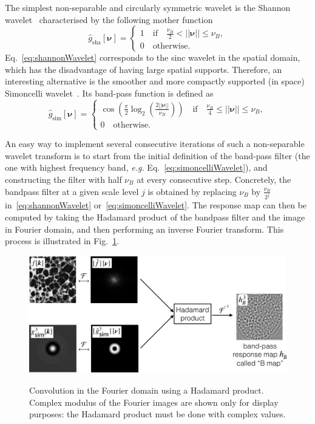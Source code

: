 \documentclass[fleqn,a4paper,oneside,openany]{book}
\begin{document}
The simplest non-separable and circularly symmetric wavelet is the Shannon wavelet~\cite{UCV2011} characterised by the following mother function
%
\begin{equation}\label{eq:shannonWavelet}
\hat{g}_{\text{sha}}[\boldsymbol{\nu}]=
\begin{cases}
1\quad\text{if}\quad\frac{\nu_B}{2}< ||\boldsymbol{\nu}|| \leq \nu_B,\\
0\quad\text{otherwise}.
\end{cases}
\end{equation}
%
Eq.~\eqref{eq:shannonWavelet} corresponds to the sinc wavelet in the spatial domain, which has the disadvantage of having large spatial supports. Therefore, an interesting alternative is the smoother and more compactly supported (in space) Simoncelli wavelet~\cite{PoS2000}. Its band-pass function is defined as
%
\begin{equation}\label{eq:simoncelliWavelet}
\hat{g}_{\text{sim}}[\boldsymbol{\nu}]=
\begin{cases}
\cos\left(\frac{\pi}{2}\log_2\left(\frac{2||\boldsymbol{\nu}||}{\nu_B}\right)\right)\quad\text{if}\quad\frac{\nu_B}{4}\leq ||\boldsymbol{\nu}|| \leq \nu_B,\\
0\quad\text{otherwise}.
\end{cases}
\end{equation}
%

An easy way to implement several consecutive iterations of such a non-separable wavelet transform is to start from the initial definition of the band-pass filter (the one with highest frequency band, \emph{e.g.} Eq.~\eqref{eq:simoncelliWavelet}), and constructing the filter with half $\nu_B$ at every consecutive step. Concretely, the bandpass filter at a given scale level $j$ is obtained by replacing $\nu_B$ by $\frac{\nu_B}{2^j}$ in~\eqref{eq:shannonWavelet} or~\eqref{eq:simoncelliWavelet}.
The response map can then be computed by taking the Hadamard product of the bandpass filter and the image in Fourier domain, and then performing an inverse Fourier transform.
This process is illustrated in Fig.~\ref{fig:hadamardConv}.
%
\begin{figure}
\centering
\includegraphics[trim = 0 0 0 0, clip, width=1\linewidth]{hadamardConv.png}\\
\caption{Convolution in the Fourier domain using a Hadamard product. Complex modulus of the Fourier images are shown only for display purposes: the Hadamard product must be done with complex values.}
  \label{fig:hadamardConv}
\end{figure}
%
\end{document}
